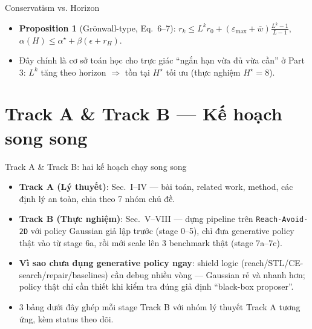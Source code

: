 \documentclass[aspectratio=169]{beamer}
\begin{document}
\begin{frame}[t,shrink=8]{Conservatism vs. Horizon}
\begin{itemize}
    \item \textbf{Proposition 1} (Grönwall-type, Eq.~6--7): $r_k\le L^k r_0+(\varepsilon_{\max}+\bar w)\frac{L^k-1}{L-1}$, $\alpha(H)\le\alpha^\star+\beta(\epsilon+r_H)$.
    \item Đây chính là cơ sở toán học cho trực giác ``ngắn hạn vừa đủ vừa cần'' ở Part 3: $L^k$ tăng theo horizon $\Rightarrow$ tồn tại $H^\star$ tối ưu (thực nghiệm $H^\star=8$).
\end{itemize}
\end{frame}

\section{Track A \& Track B --- Kế hoạch song song}

\begin{frame}[t,shrink=8]{Track A \& Track B: hai kế hoạch chạy song song}
\begin{itemize}
    \item \textbf{Track A (Lý thuyết)}: Sec.~I--IV --- bài toán, related work, method, các định lý an toàn, chia theo 7 nhóm chủ đề.
    \item \textbf{Track B (Thực nghiệm)}: Sec.~V--VIII --- dựng pipeline trên \texttt{Reach-Avoid-2D} với policy Gaussian giả lập trước (stage 0--5), chỉ đưa generative policy thật vào từ stage 6a, rồi mới scale lên 3 benchmark thật (stage 7a--7c).
    \item \textbf{Vì sao chưa đụng generative policy ngay}: shield logic (reach/STL/CE-search/repair/baselines) cần debug nhiều vòng --- Gaussian rẻ và nhanh hơn; policy thật chỉ cần thiết khi kiểm tra đúng giả định ``black-box proposer''.
    \item 3 bảng dưới đây ghép mỗi stage Track B với nhóm lý thuyết Track A tương ứng, kèm status theo dõi.
\end{itemize}
\end{frame}
\end{document}
